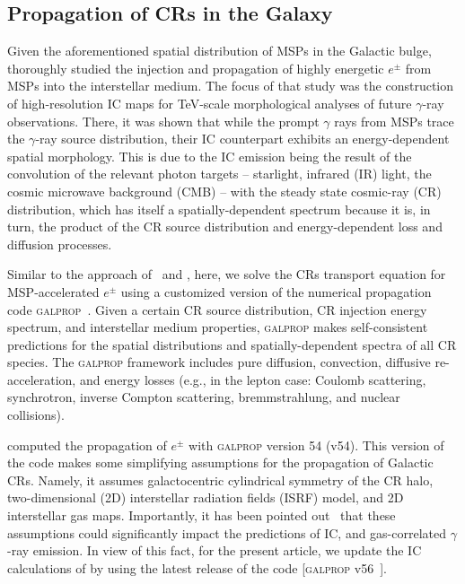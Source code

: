 \documentclass[doublespace,nopageskip]{VTthesis} %
\begin{document}
\subsection{Propagation of CRs in the Galaxy}
\label{subsec:propagation}

Given the aforementioned spatial distribution of MSPs in the Galactic bulge, \cite{Song:2019nrx} thoroughly studied the injection and propagation of highly energetic $e^{\pm}$ from MSPs into the interstellar medium. The focus of that study was the construction of high-resolution IC maps for TeV-scale morphological analyses of future $\gamma$-ray observations. There, it was shown that while the prompt $\gamma$ rays from MSPs trace the $\gamma$-ray source distribution, their IC counterpart exhibits an energy-dependent spatial morphology. This is due to the IC emission being the result of 
the convolution of the relevant photon targets -- starlight, infrared (IR) light, the cosmic microwave background (CMB) -- with the
steady state cosmic-ray (CR) distribution, which has itself 
a spatially-dependent spectrum because it is, in turn, the product of the CR source distribution and energy-dependent loss and diffusion processes.


Similar to the approach of~\citet{Song:2019nrx} and \citet{Ishiwata:2019aet}, here, we solve the CRs transport equation for MSP-accelerated $e^{\pm}$ using a customized version of the numerical propagation code \textsc{galprop}~\citep{Porter:2006tb,Strong:2007nh}. Given a certain CR source distribution, CR injection energy spectrum, and interstellar medium properties, \textsc{galprop} makes self-consistent predictions  
for the spatial distributions and spatially-dependent spectra of
 all CR species. The \textsc{galprop} framework includes pure diffusion, convection, diffusive re-acceleration, and energy losses (e.g., in the lepton case: Coulomb scattering, synchrotron, inverse Compton scattering, bremmstrahlung,  and nuclear collisions). 


\citet{Song:2019nrx} computed the propagation of $e^{\pm}$ with \textsc{galprop} version 54 (v54). This version of the code makes some simplifying assumptions for the propagation of Galactic CRs. Namely, it  assumes galactocentric cylindrical symmetry of the CR halo, two-dimensional (2D) interstellar radiation fields (ISRF) model, and 2D interstellar gas maps. Importantly, it has been pointed out~\citep{Porter:2017vaa,Johannesson:2018bit} that these assumptions could significantly impact the predictions of IC, and gas-correlated $\gamma$-ray emission. In view of this fact, for the present article, we update the IC calculations of \citet{Song:2019nrx} by using the latest release of the code [\textsc{galprop} v56~\citep{Porter:2017vaa,Johannesson:2018bit}].    
\end{document}
